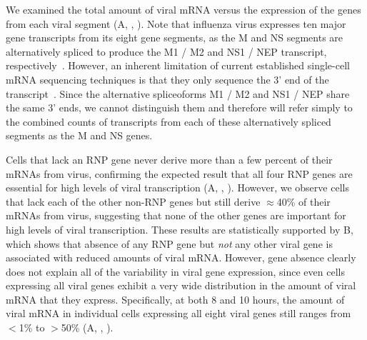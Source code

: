 \documentclass[9pt,lineno]{elife}
\begin{document}
\begin{figure}[t!]

\end{figure}

We examined the total amount of viral mRNA versus the expression of the genes from each viral segment (A, , ). 
Note that influenza virus expresses ten major gene transcripts from its eight gene segments, as the M and NS segments are alternatively spliced to produce the M1 / M2 and NS1 / NEP transcript, respectively~\citep{dubois2014influenza}.
However, an inherent limitation of current established single-cell mRNA sequencing techniques is that they only sequence the 3' end of the transcript~\citep{zheng2017massively,macosko2015highly,Klein:2015ki,cao2017comprehensive}.
Since the alternative spliceoforms M1 / M2 and NS1 / NEP share the same 3' ends, we cannot distinguish them and therefore will refer simply to the combined counts of transcripts from each of these alternatively spliced segments as the M and NS genes.

Cells that lack an RNP gene never derive more than a few percent of their mRNAs from virus, confirming the expected result that all four RNP genes are essential for high levels of viral transcription (A, , ).
However, we observe cells that lack each of the other non-RNP genes but still derive $\approx$40\% of their mRNAs from virus, suggesting that none of the other genes are important for high levels of viral transcription.
These results are statistically supported by B, which shows that absence of any RNP gene but \emph{not} any other viral gene is associated with reduced amounts of viral mRNA. 
However, gene absence clearly does not explain all of the variability in viral gene expression, since even cells expressing all viral genes exhibit a very wide distribution in the amount of viral mRNA that they express.
Specifically, at both 8 and 10 hours, the amount of viral mRNA in individual cells expressing all eight viral genes still ranges from $<$1\% to $>$50\% (A, , ).   
\end{document}
